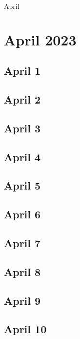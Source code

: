 April%
%
%
%

\chapter{April 2023}
\label{intro} %

\section{April 1}

\section{April 2}

\section{April 3}

\section{April 4}

\section{April 5}

\section{April 6}

\section{April 7}

\section{April 8}

\section{April 9}

\section{April 10}

